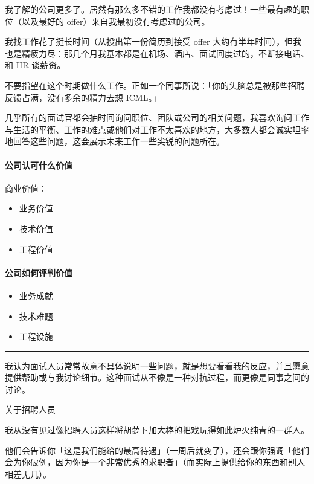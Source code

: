 \documentclass[letterpaper,11pt,english]{sphinxmanual}
\begin{document}
我了解的公司更多了。居然有那么多不错的工作我都没有考虑过！一些最有趣的职位（以及最好的
offer）来自我最初没有考虑过的公司。

我找工作花了挺长时间（从投出第一份简历到接受 offer
大约有半年时间），但我也是精疲力尽：那几个月我基本都是在机场、酒店、面试间度过的，不断接电话、和
HR 谈薪资。

不要指望在这个时期做什么工作。正如一个同事所说：「你的头脑总是被那些招聘反馈占满，没有多余的精力去想
ICML。」

几乎所有的面试官都会抽时间询问职位、团队或公司的相关问题，我喜欢询问工作与生活的平衡、工作的难点或他们对工作不太喜欢的地方，大多数人都会诚实坦率地回答这些问题，这会展示未来工作一些尖锐的问题所在。


\paragraph{公司认可什么价值}
\label{\detokenize{chapter_interview/offer:id2}}
商业价值：
\begin{itemize}
\item {} 
业务价值

\item {} 
技术价值

\item {} 
工程价值

\end{itemize}


\paragraph{公司如何评判价值}
\label{\detokenize{chapter_interview/offer:id3}}\begin{itemize}
\item {} 
业务成就

\item {} 
技术难题

\item {} 
工程设施

\end{itemize}


\bigskip\hrule\bigskip


我认为面试人员常常故意不具体说明一些问题，就是想要看看我的反应，并且愿意提供帮助或与我讨论细节。这种面试从不像是一种对抗过程，而更像是同事之间的讨论。

关于招聘人员

我从没有见过像招聘人员这样将胡萝卜加大棒的把戏玩得如此炉火纯青的一群人。

他们会告诉你「这是我们能给的最高待遇」（一周后就变了），还会跟你强调「他们会为你破例，因为你是一个非常优秀的求职者」（而实际上提供给你的东西和别人相差无几）。
\end{document}

